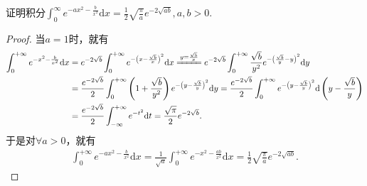 \documentclass[../../main.tex]{subfiles}
\begin{document}
\begin{example}\label{example:常用定积分公式}
证明积分$\int_{0}^{\infty}e^{-ax^{2}-\frac{b}{x^{2}}}\mathrm{d}x=\frac{1}{2}\sqrt{\frac{\pi}{a}}e^{-2\sqrt{ab}},a,b>0.$
\end{example}
\begin{proof}
当\(a=1\)时，就有
\begin{align*}
\int_0^{+\infty}{e^{-x^2-\frac{b}{x^2}}\mathrm{d}x}&=e^{-2\sqrt{b}}\int_0^{+\infty}{e^{-\left( x-\frac{\sqrt{b}}{x} \right) ^2}\mathrm{d}x}\xlongequal{y=\frac{\sqrt{b}}{x}}e^{-2\sqrt{b}}\int_0^{+\infty}{\frac{\sqrt{b}}{y^2}e^{-\left( \frac{\sqrt{b}}{y}-y \right) ^2}\mathrm{d}y}\nonumber\\
&=\frac{e^{-2\sqrt{b}}}{2}\int_0^{+\infty}{\left( 1+\frac{\sqrt{b}}{y^2} \right) e^{-\left( y-\frac{\sqrt{b}}{y} \right) ^2}\mathrm{d}y}=\frac{e^{-2\sqrt{b}}}{2}\int_0^{+\infty}{e^{-\left( y-\frac{\sqrt{b}}{y} \right) ^2}\mathrm{d}\left( y-\frac{\sqrt{b}}{y} \right)}\nonumber\\
&=\frac{e^{-2\sqrt{b}}}{2}\int_{-\infty}^{+\infty}{e^{-t^2}\mathrm{d}t}=\frac{\sqrt{\pi}}{2}e^{-2\sqrt{b}}.
\end{align*}
于是对\(\forall a>0\)，就有
\begin{align*}
\int_0^{+\infty}{e^{-ax^2-\frac{b}{x^2}}\mathrm{d}x}=\frac{1}{\sqrt{a}}\int_0^{+\infty}{e^{-x^2-\frac{ab}{x^2}}\mathrm{d}x}=\frac{1}{2}\sqrt{\frac{\pi}{a}}e^{-2\sqrt{ab}}.
\end{align*}
\end{proof}
\end{document}
